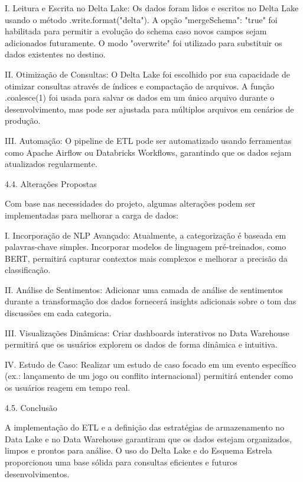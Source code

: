 \documentclass[
  letterpaper,
  DIV=11,
  numbers=noendperiod]{scrartcl}
\begin{document}
\begin{VerbatimWithBreaks}
I. Leitura e Escrita no Delta Lake:  
    Os dados foram lidos e escritos no Delta Lake usando o método .write.format("delta"). A opção "mergeSchema": "true" foi habilitada para permitir a evolução do schema caso novos campos sejam adicionados futuramente.
    O modo "overwrite" foi utilizado para substituir os dados existentes no destino.
     

II. Otimização de Consultas:  
    O Delta Lake foi escolhido por sua capacidade de otimizar consultas através de índices e compactação de arquivos.
    A função .coalesce(1) foi usada para salvar os dados em um único arquivo durante o desenvolvimento, mas pode ser ajustada para múltiplos arquivos em cenários de produção.
     

III. Automação:  
    O pipeline de ETL pode ser automatizado usando ferramentas como Apache Airflow ou Databricks Workflows, garantindo que os dados sejam atualizados regularmente.
     
 
\end{VerbatimWithBreaks}

4.4. Alterações Propostas

Com base nas necessidades do projeto, algumas alterações podem ser
implementadas para melhorar a carga de dados:

\begin{VerbatimWithBreaks}
I. Incorporação de NLP Avançado:  
    Atualmente, a categorização é baseada em palavras-chave simples. Incorporar modelos de linguagem pré-treinados, como BERT, permitirá capturar contextos mais complexos e melhorar a precisão da classificação.
     

II. Análise de Sentimentos:  
    Adicionar uma camada de análise de sentimentos durante a transformação dos dados fornecerá insights adicionais sobre o tom das discussões em cada categoria.
     

III. Visualizações Dinâmicas:  
    Criar dashboards interativos no Data Warehouse permitirá que os usuários explorem os dados de forma dinâmica e intuitiva.
     

IV. Estudo de Caso:  
    Realizar um estudo de caso focado em um evento específico (ex.: lançamento de um jogo ou conflito internacional) permitirá entender como os usuários reagem em tempo real.
     
 
\end{VerbatimWithBreaks}

4.5. Conclusão

A implementação do ETL e a definição das estratégias de armazenamento no
Data Lake e no Data Warehouse garantiram que os dados estejam
organizados, limpos e prontos para análise. O uso do Delta Lake e do
Esquema Estrela proporcionou uma base sólida para consultas eficientes e
futuros desenvolvimentos.
\end{document}
